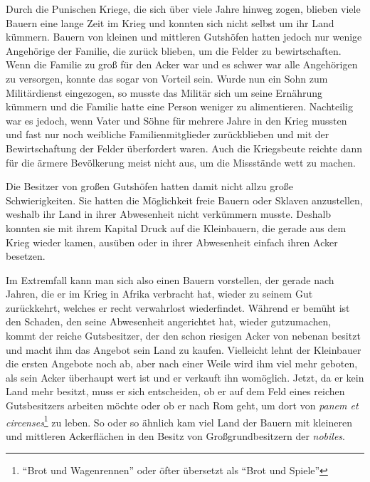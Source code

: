 \documentclass[
    12pt,
    smallheadings,
    ]{scrreprt}
\begin{document}
Durch die Punischen Kriege, die sich über viele Jahre hinweg zogen, blieben viele Bauern eine lange Zeit im Krieg und konnten sich nicht selbst um ihr Land kümmern.
Bauern von kleinen und mittleren Gutshöfen hatten jedoch nur wenige Angehörige der Familie, die zurück blieben, um die Felder zu bewirtschaften.
Wenn die Familie zu groß für den Acker war und es schwer war alle Angehörigen zu versorgen, konnte das sogar von Vorteil sein. 
Wurde nun ein Sohn zum Militärdienst eingezogen, so musste das Militär sich um seine Ernährung kümmern und die Familie hatte eine Person weniger zu alimentieren.
Nachteilig war es jedoch, wenn Vater und Söhne für mehrere Jahre in den Krieg mussten und fast nur noch weibliche Familienmitglieder zurückblieben und mit der Bewirtschaftung der Felder überfordert waren.
Auch die Kriegsbeute reichte dann für die ärmere Bevölkerung meist nicht aus, um die Missstände wett zu machen.

Die Besitzer von großen Gutshöfen hatten damit nicht allzu große Schwierigkeiten.
Sie hatten die Möglichkeit freie Bauern oder Sklaven anzustellen, weshalb ihr Land in ihrer Abwesenheit nicht verkümmern musste.
Deshalb konnten sie mit ihrem Kapital Druck auf die Kleinbauern, die gerade aus dem Krieg wieder kamen, ausüben oder in ihrer Abwesenheit einfach ihren Acker besetzen.


Im Extremfall kann man sich also einen Bauern vorstellen, der gerade nach Jahren, die er im Krieg in Afrika verbracht hat, wieder zu seinem Gut zurückkehrt, welches er recht verwahrlost wiederfindet.
Während er bemüht ist den Schaden, den seine Abwesenheit angerichtet hat, wieder gutzumachen, kommt der reiche Gutsbesitzer, der den schon riesigen Acker von nebenan besitzt und macht ihm das Angebot sein Land zu kaufen.
Vielleicht lehnt der Kleinbauer die ersten Angebote noch ab, aber nach einer Weile wird ihm viel mehr geboten, als sein Acker überhaupt wert ist und er verkauft ihn womöglich.
Jetzt, da er kein Land mehr besitzt, muss er sich entscheiden, ob er auf dem Feld eines reichen Gutsbesitzers arbeiten möchte oder ob er nach Rom geht, um dort von \textit{panem et circenses}\footnote{"`Brot und Wagenrennen"' oder öfter übersetzt als "`Brot und Spiele"'} zu leben.
So oder so ähnlich kam viel Land der Bauern mit kleineren und mittleren Ackerflächen in den Besitz von Großgrundbesitzern der \textit{nobiles}.
\end{document}
